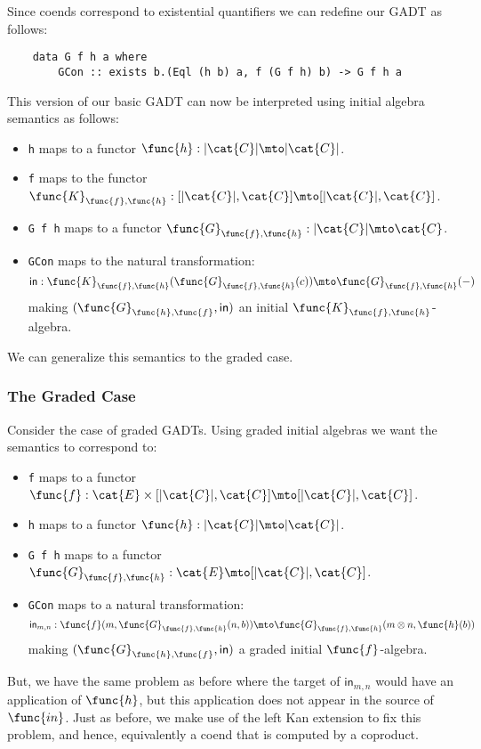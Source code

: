 Since coends correspond to existential quantifiers we can redefine our
GADT as follows:
\begin{verbatim}
    data G f h a where
        GCon :: exists b.(Eql (h b) a, f (G f h) b) -> G f h a
\end{verbatim}
This version of our basic GADT can now be interpreted using initial
algebra semantics as follows:
\begin{itemize}
    \item \verb!h! maps to a functor $\func{h} : |\cat{C}| \mto
    |\cat{C}|$. 

    \item \verb!f! maps to the functor $\func{K}_{\func{f},\func{h}} : [|\cat{C}|,\cat{C}]
    \mto [|\cat{C}|, \cat{C}]$.    

    \item \verb!G f h! maps to a functor 
          $\func{G}_{\func{f},\func{h}} : |\cat{C}| \mto \cat{C}$.

    \item \verb!GCon! maps to the natural transformation:
          \[
            \mathsf{in} : 
            \func{K}_{\func{f},\func{h}}(\func{G}_{\func{f},\func{h}}(c))
            \mto 
            \func{G}_{\func{f},\func{h}}(-)
          \]
          making $(\func{G}_{\func{h},\func{f}},\mathsf{in})$ an
          initial $\func{K}_{\func{f},\func{h}}$-algebra.
\end{itemize}
We can generalize this semantics to the graded case.

\subsubsection{The Graded Case}
\label{subsubsec:the_graded_case}
Consider the case of graded GADTs. Using graded initial algebras we
want the semantics to correspond to:
\begin{itemize}
    \item \verb!f! maps to a functor 
    $\func{f} : \cat{E} \times [|\cat{C}|,\cat{C}] \mto [|\cat{C}|, \cat{C}]$.

    \item \verb!h! maps to a functor 
    $\func{h} : |\cat{C}| \mto |\cat{C}|$. 

    \item \verb!G f h! maps to a functor 
          $\func{G}_{\func{f},\func{h}} : \cat{E} \mto [|\cat{C}|,\cat{C}]$.

    \item \verb!GCon! maps to a natural transformation:
          \[
            \mathsf{in}_{m,n} : \func{f}(m,\func{G}_{\func{f},\func{h}}(n,b)) \mto \func{G}_{\func{f},\func{h}}(m \otimes n,\func{h}(b))
          \]
          making $(\func{G}_{\func{h},\func{f}},\mathsf{in})$ a graded
          initial $\func{f}$-algebra.
\end{itemize}
\noindent But, we have the same problem as before where the target of
$\mathsf{in}_{m,n}$ would have an application of $\func{h}$, but this
application does not appear in the source of $\func{in}$.  Just as
before, we make use of the left Kan extension to fix this problem, and
hence, equivalently a coend that is computed by a coproduct.

